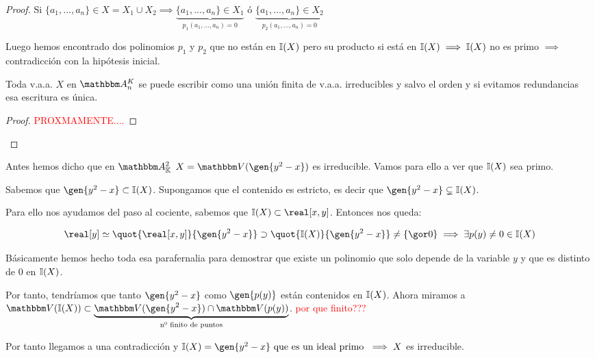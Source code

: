 \begin{proof}
	Si $\{a_1,...,a_n\} \in X = X_1 \cup X_2 \implies \underbrace{\{a_1,...,a_n\}\in X_1}_{p_1(a_1,...,a_n)=0}$ ó $\underbrace{\{a_1,...,a_n\}\in X_2}_{p_2(a_1,...,a_n)=0}$
	
	Luego hemos encontrado dos polinomios $p_1$ y $p_2$ que no están en $\mathbb{I}(X)$ pero su producto si está en $\mathbb{I}(X) \implies \mathbb{I}(X)$ no es primo $\implies$ contradicción con la hipótesis inicial.
	
	\begin{theorem}
		Toda v.a.a. $X$ en $\Akn$ se puede escribir como una unión finita de v.a.a. irreducibles y salvo el orden y si evitamos redundancias esa escritura es única.
	\end{theorem}
	
	\begin{proof}
		\textcolor{red}{PROXMAMENTE....}
	\end{proof}
	
	
\end{proof}

\begin{example}
	 Antes hemos dicho que en $\A^2_{\K}$ $X=\V(\gen{y^2-x})$ es irreducible. Vamos para ello a ver que $\mathbb{I}(X)$ sea primo. 
	
	Sabemos que $\gen{y^2-x} \subset \I(X)$. Supongamos que el contenido es estricto, es decir que $\gen{y^2-x} \subsetneq \I(X)$.
	
	Para ello nos ayudamos del paso al cociente, sabemos que $\I(X) \subset \real[x,y]$. Entonces nos queda:
	
	$$ \real[y] \simeq \quot{\real[x,y]}{\gen{y^2-x}} \supset \quot{\I(X)}{\gen{y^2-x}}  \neq \{\cls{0}\} \implies \exists p(y) \neq 0 \in \I(X)$$
	
	Básicamente hemos hecho toda esa parafernalia para demostrar que existe un polinomio que solo depende de la variable $y$ y que es distinto de 0 en $\mathbb{I}(X)$.
	
	Por tanto, tendríamos que tanto $\gen{y^2-x}$ como $\gen{p(y)}$ están contenidos en $\mathbb{I}(X)$. Ahora miramos a $\V(\I(X)) \subset \underbrace{\V(\gen{y^2-x}) \cap \V(p(y))}_{\text{nº finito de puntos}}$. \textcolor{red}{por que finito???}
	
	Por tanto  llegamos a una contradicción y $\I(X)=\gen{y^2-x} \text{ que es un ideal primo }\implies X$ es irreducible.
\end{example}